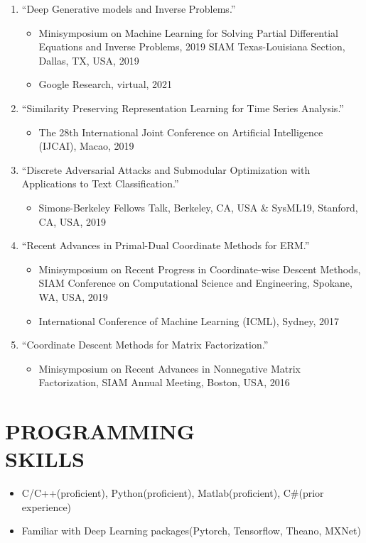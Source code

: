 \documentclass[margin, 10pt]{res} %
\begin{document}
\begin{resume}
\begin{enumerate}
\item{``Deep Generative models and Inverse Problems.''
	\begin{itemize}[noitemsep,topsep=0pt,parsep=0pt,partopsep=0pt]
		\item        Minisymposium on Machine Learning for Solving Partial Differential 
		Equations and Inverse Problems, 2019 SIAM Texas-Louisiana Section, Dallas,
		TX, USA, 2019 
		\item  Google Research, virtual, 2021
	\end{itemize}
}
\item{``Similarity Preserving Representation Learning for Time Series Analysis.''
	\begin{itemize}[noitemsep,topsep=0pt,parsep=0pt,partopsep=0pt]
		\item The 28th International Joint Conference on Artificial Intelligence (IJCAI), Macao, 2019
	\end{itemize}
}
 \item{``Discrete Adversarial Attacks 
 and Submodular Optimization with Applications to Text Classification.''
 \begin{itemize}[noitemsep,topsep=0pt,parsep=0pt,partopsep=0pt]
 	\item  Simons-Berkeley Fellows Talk, Berkeley, CA, USA \& SysML19, Stanford, CA, 
 	USA, 2019
 \end{itemize} 
}
 \item{``Recent 
     Advances in Primal-Dual Coordinate Methods for ERM.''
     \begin{itemize}[noitemsep,topsep=0pt,parsep=0pt,partopsep=0pt]
     	\item      Minisymposium on Recent Progress in Coordinate-wise Descent Methods, SIAM Conference on Computational Science and Engineering, Spokane, WA, USA, 2019
     	\item  International Conference of Machine Learning (ICML), Sydney, 2017  
     \end{itemize}
}
 \item{``Coordinate Descent Methods for Matrix Factorization.''
 	\begin{itemize}[noitemsep,topsep=0pt,parsep=0pt,partopsep=0pt]
 		\item    Minisymposium on Recent Advances in Nonnegative Matrix Factorization, SIAM 
 		Annual Meeting, Boston, USA, 2016
 	\end{itemize}
}


 \end{enumerate}

\section{PROGRAMMING \\ SKILLS} 
\begin{itemize}
	\item[]  C/C++(proficient), Python(proficient), Matlab(proficient), C\#(prior experience)
  \item[]  Familiar with Deep Learning packages(Pytorch, Tensorflow, Theano, MXNet)
\end{itemize}

\end{resume}
\end{document}
